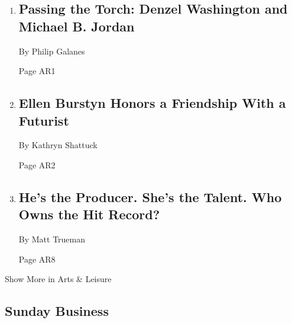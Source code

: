 \begin{enumerate}
\def\labelenumi{\arabic{enumi}.}
\item
  \href{/2018/04/19/arts/television/denzel-washington-michael-b-jordan-black-panther-iceman-cometh.html}{}

  \hypertarget{passing-the-torch-denzel-washington-and-michael-b-jordan}{%
  \subsection{Passing the Torch: Denzel Washington and Michael B.
  Jordan}\label{passing-the-torch-denzel-washington-and-michael-b-jordan}}

  By Philip Galanes

  Page AR1
\item
  \href{/2018/04/20/movies/ellen-burstyn-the-house-of-tomorrow.html}{}

  \hypertarget{ellen-burstyn-honors-a-friendship-with-a-futurist}{%
  \subsection{Ellen Burstyn Honors a Friendship With a
  Futurist}\label{ellen-burstyn-honors-a-friendship-with-a-futurist}}

  By Kathryn Shattuck

  Page AR2
\item
  \href{/2018/04/18/theater/joe-penhall-mood-music-old-vic.html}{}

  \hypertarget{hes-the-producer-shes-the-talent-who-owns-the-hit-record}{%
  \subsection{He's the Producer. She's the Talent. Who Owns the Hit
  Record?}\label{hes-the-producer-shes-the-talent-who-owns-the-hit-record}}

  By Matt Trueman

  Page AR8
\end{enumerate}

Show More in Arts \& Leisure

\hypertarget{sunday-business}{%
\subsection{Sunday Business}\label{sunday-business}}

